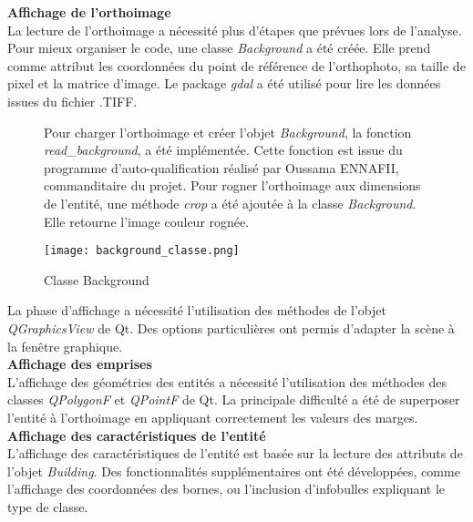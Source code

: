 \noindent\textbf{Affichage de l'orthoimage}\\

La lecture de l'orthoimage a nécessité plus d'étapes que prévues lors de l'analyse. Pour mieux organiser le code, une classe \textit{Background} a été créée. Elle prend comme attribut les coordonnées du point de référence de l'orthophoto, sa taille de pixel et la matrice d'image. Le package \textit{gdal} a été utilisé pour lire les données issues du fichier .TIFF.\\

\begin{figure}[!h]
	\begin{minipage}{0.50\linewidth}\parindent12pt
		\indent  Pour charger l'orthoimage et créer l'objet \textit{Background}, la fonction \textit{read\_background},  a été implémentée. Cette fonction est issue du programme  d'auto-qualification réalisé par Oussama ENNAFII, commanditaire du projet. Pour rogner l'orthoimage aux dimensions de l'entité, une méthode \textit{crop} a été ajoutée à la classe \textit{Background}. Elle retourne l'image couleur rognée.\\
	\end{minipage}
	\hfill
	\begin{minipage}{0.45\linewidth}
		\centering
		\texttt{[image: background\_classe.png]}  \\
		\caption[Classe Background]{Classe Background}
		\label{fig:backclasse}
	\end{minipage}
\end{figure}

La phase d'affichage a nécessité l'utilisation des méthodes de l'objet \textit{QGraphicsView} de Qt. Des options particulières ont permis d'adapter la scène à la fenêtre graphique.\\

\noindent\textbf{Affichage des emprises}\\

L'affichage des géométries des entités a nécessité l'utilisation des méthodes des classes \textit{QPolygonF} et \textit{QPointF} de Qt. La principale difficulté a été de superposer l'entité à l'orthoimage en appliquant correctement les valeurs des marges.\\

\noindent\textbf{Affichage des caractéristiques de l'entité}\\

L'affichage des caractéristiques de l'entité est basée sur la lecture des attributs de l'objet \textit{Building}. Des fonctionnalités supplémentaires ont été développées, comme l'affichage des coordonnées des bornes, ou l'inclusion d'infobulles expliquant le type de classe.

